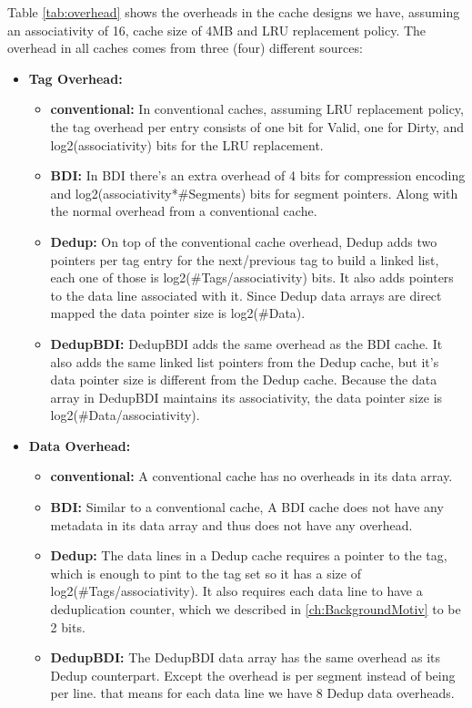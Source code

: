 Table \ref{tab:overhead} shows the overheads in the cache designs we have, assuming an associativity of 16, cache size of 4MB and LRU replacement policy. The overhead in all caches comes from three (four) different sources:
\begin{itemize}
    \item \textbf{Tag Overhead:}
    \begin{itemize}
        \item \textbf{conventional:} In conventional caches, assuming LRU replacement policy, the tag overhead per entry consists of one bit for Valid, one for Dirty, and log2(associativity) bits for the LRU replacement. 
        \item \textbf{BDI:} In BDI there's an extra overhead of 4 bits for compression encoding and log2(associativity*\#Segments) bits for segment pointers. Along with the normal overhead from a conventional cache.
        \item \textbf{Dedup:} On top of the conventional cache overhead, Dedup adds two pointers per tag entry for the next/previous tag to build a linked list, each one of those is log2(\#Tags/associativity) bits. It also adds pointers to the data line associated with it. Since Dedup data arrays are direct mapped the data pointer size is log2(\#Data).
        \item \textbf{DedupBDI:} DedupBDI adds the same overhead as the BDI cache. It also adds the same linked list pointers from the Dedup cache, but it's data pointer size is different from the Dedup cache. Because the data array in DedupBDI maintains its associativity, the data pointer size is log2(\#Data/associativity).
    \end{itemize}
    \item \textbf{Data Overhead:}
    \begin{itemize}
        \item \textbf{conventional:} A conventional cache has no overheads in its data array.
        \item \textbf{BDI:} Similar to a conventional cache, A BDI cache does not have any metadata in its data array and thus does not have any overhead.
        \item \textbf{Dedup:} The data lines in a Dedup cache requires a pointer to the tag, which is enough to pint to the tag set so it has a size of log2(\#Tags/associativity). It also requires each data line to have a deduplication counter, which we described in \ref{ch:BackgroundMotiv} to be 2 bits.
        \item \textbf{DedupBDI:} The DedupBDI data array has the same overhead as its Dedup counterpart. Except the overhead is per segment instead of being per line. that means for each data line we have 8 Dedup data overheads.

\end{itemize}
\end{itemize}
